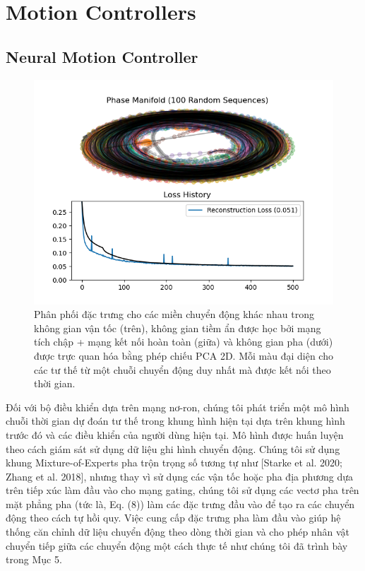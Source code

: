 \section{Motion Controllers}
\label{MotionControllers}

\subsection{Neural Motion Controller}

\begin{figure}
	\centering
	\includegraphics[]{images/PhaseManifold.png}
	\caption{Phân phối đặc trưng cho các miền chuyển động khác nhau trong không gian vận tốc (trên), không gian tiềm ẩn được học bởi mạng tích chập + mạng kết nối hoàn toàn (giữa) và không gian pha (dưới) được trực quan hóa bằng phép chiếu PCA 2D. Mỗi màu đại diện cho các tư thế từ một chuỗi chuyển động duy nhất mà được kết nối theo thời gian.}
	\label{fig:PhaseManifold}
\end{figure}


Đối với bộ điều khiển dựa trên mạng nơ-ron, chúng tôi phát triển một mô hình chuỗi thời gian dự đoán tư thế trong khung hình hiện tại dựa trên khung hình trước đó và các điều khiển của người dùng hiện tại. Mô hình được huấn luyện theo cách giám sát sử dụng dữ liệu ghi hình chuyển động. Chúng tôi sử dụng khung Mixture-of-Experts pha trộn trọng số tương tự như [Starke et al. 2020; Zhang et al. 2018], nhưng thay vì sử dụng các vận tốc hoặc pha địa phương dựa trên tiếp xúc làm đầu vào cho mạng gating, chúng tôi sử dụng các vectơ pha trên mặt phẳng pha (tức là, Eq. (8)) làm các đặc trưng đầu vào để tạo ra các chuyển động theo cách tự hồi quy. Việc cung cấp đặc trưng pha làm đầu vào giúp hệ thống căn chỉnh dữ liệu chuyển động theo dòng thời gian và cho phép nhân vật chuyển tiếp giữa các chuyển động một cách thực tế như chúng tôi đã trình bày trong Mục 5.

